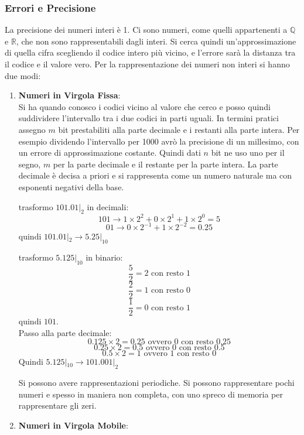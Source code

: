 \documentclass[a4paper,12pt, oneside]{book}
\begin{document}
\subsubsection{Errori e Precisione}
La precisione dei numeri interi è 1. Ci sono numeri, come quelli appartenenti a $\mathbb{Q}$ e $\mathbb{R}$, che non sono rappresentabili dagli interi. Si cerca quindi un'approssimazione di quella cifra scegliendo il codice intero più vicino, e l'errore sarà la distanza tra il codice e il valore vero.
Per la rappresentazione dei numeri non interi si hanno due modi:
\begin{enumerate}
\item \textbf{Numeri in Virgola Fissa}:\\
Si ha quando conosco i codici vicino al valore che cerco e posso quindi suddividere l'intervallo tra i due codici in parti uguali. In termini pratici assegno $m$ bit prestabiliti alla parte decimale e i restanti alla parte intera. Per esempio dividendo l'intervallo per 1000 avrò la precisione di un millesimo, con un errore di approssimazione costante. Quindi dati $n$ bit ne uso uno per il segno, $m$ per la parte decimale e il restante per la parte intera. La parte decimale è decisa a priori e si rappresenta come un numero naturale ma con esponenti negativi della base.
\begin{esempio}
trasformo $101.01|_{2}$ in decimali:\\
$$101 \rightarrow 1\times 2^2+ 0\times 2^1+1 \times 2^0=5$$
$$01\rightarrow 0\times 2^{-1}+1\times 2^{-2}=0.25$$
quindi $101.01|_{2}\rightarrow 5.25|_{10}$
\end{esempio}
\begin{esempio}
trasformo $5.125|_{10}$ in binario:\\
$$\frac{5}{2}=2 \mbox{ con resto } 1$$
$$\frac{2}{2}=1 \mbox{ con resto } 0$$
$$\frac{1}{2}=0 \mbox{ con resto } 1$$
quindi $101$.\\ 
Passo alla parte decimale:\\
$$0.125\times 2 = 0.25 \mbox{ ovvero } 0 \mbox{ con resto } 0.25$$
$$0.25\times 2 = 0.5 \mbox{ ovvero } 0 \mbox{ con resto } 0.5$$
$$0.5\times 2 = 1 \mbox{ ovvero } 1 \mbox{ con resto } 0$$
Quindi $5.125|_{10}\rightarrow 101.001|_{2}$
\end{esempio}
Si possono avere rappresentazioni periodiche. Si possono rappresentare pochi numeri e spesso in maniera non completa, con uno spreco di memoria per rappresentare gli zeri. 
\item \textbf{Numeri in Virgola Mobile}:\\

\end{enumerate}
\end{document}
